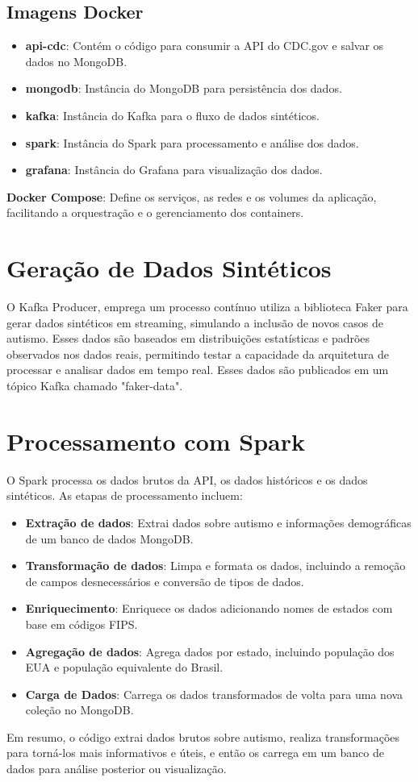 \documentclass[12pt]{article}
\begin{document}
\subsection{Imagens Docker}
\begin{itemize}
    \item \textbf{api-cdc}: Contém o código para consumir a API do CDC.gov e salvar os dados no MongoDB.
    \item \textbf{mongodb}: Instância do MongoDB para persistência dos dados.
    \item \textbf{kafka}: Instância do Kafka para o fluxo de dados sintéticos.
    \item \textbf{spark}: Instância do Spark para processamento e análise dos dados.
    \item \textbf{grafana}: Instância do Grafana para visualização dos dados.
\end{itemize}
\textbf{Docker Compose}: Define os serviços, as redes e os volumes da aplicação, facilitando a orquestração e o gerenciamento dos containers.

\section{Geração de Dados Sintéticos}

O Kafka Producer, emprega um processo contínuo utiliza a biblioteca Faker para gerar dados sintéticos em streaming, simulando a inclusão de novos casos de autismo. Esses dados são baseados em distribuições estatísticas e padrões observados nos dados reais, permitindo testar a capacidade da arquitetura de processar e analisar dados em tempo real. Esses dados são publicados em um tópico Kafka chamado "faker-data".

\section{Processamento com Spark}

O Spark processa os dados brutos da API, os dados históricos e os dados sintéticos. As etapas de processamento incluem:
\begin{itemize}
    \item \textbf{Extração de dados}: Extrai dados sobre autismo e informações demográficas de um banco de dados MongoDB.
    \item \textbf{Transformação de dados}: Limpa e formata os dados, incluindo a remoção de campos desnecessários e conversão de tipos de dados.
    \item \textbf{Enriquecimento}: Enriquece os dados adicionando nomes de estados com base em códigos FIPS.
    \item \textbf{Agregação de dados}: Agrega dados por estado, incluindo população dos EUA e população equivalente do Brasil.
    \item \textbf{Carga de Dados}: Carrega os dados transformados de volta para uma nova coleção no MongoDB.
\end{itemize}
Em resumo, o código extrai dados brutos sobre autismo, realiza transformações para torná-los mais informativos e úteis, e então os carrega em um banco de dados para análise posterior ou visualização.
\end{document}
